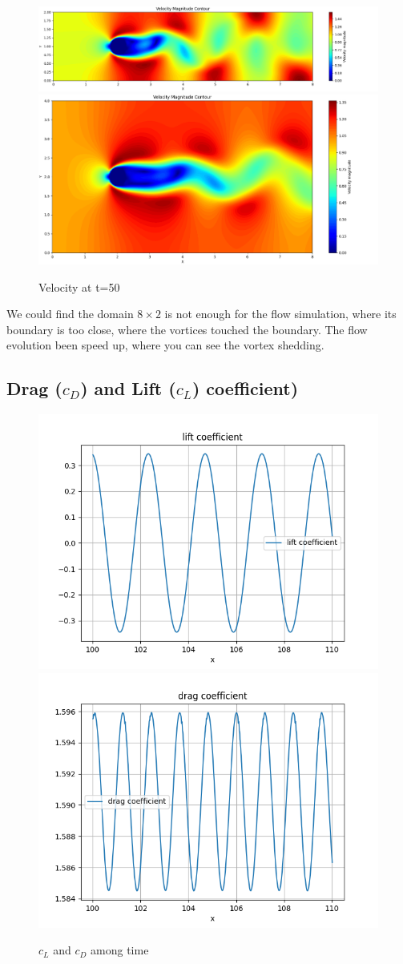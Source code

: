 \documentclass[12pt]{article}
\begin{document}
\begin{figure}[H]
    \centering
    \includegraphics[width=0.6\linewidth]{figure/N32_Re150_8x2_t50/v_N32_Re150_8x2_t50.jpg}
    \includegraphics[width=0.6\linewidth]{figure/N32_Re150_8x4_t50/v_N32_Re150_8x4_t50.jpg}
    \caption{Velocity at t=50}
\end{figure}

We could find the domain $ 8 \times 2$ is not enough for the flow simulation, where its boundary is too close, where the vortices touched the boundary. The flow evolution been speed up, where you can see the vortex shedding.


\subsection{Drag ($c_D$) and Lift ($c_L$) coefficient)}

\begin{figure}[H]
    \centering
    \includegraphics[width=0.45\linewidth]{figure/Analysis/N32_Re150_8x2/cl_N32_Re150_8x2.jpg}
    \includegraphics[width=0.45\linewidth]{figure/Analysis/N32_Re150_8x2/cd_N32_Re150_8x2.jpg}
    \caption{$c_L$ and $c_D$ among time}
\end{figure}
\end{document}

